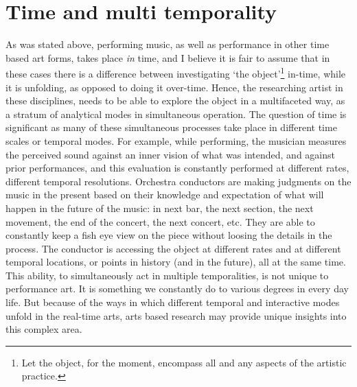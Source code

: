 
\section{Time and multi temporality}
\label{sec:performing-time}

As was stated above, performing music, as well as performance in other time based art forms, takes place \emph{in} time, and I believe it is fair to assume that in these cases there is a difference between investigating `the object'\footnote{Let the object, for the moment, encompass all and any aspects of the artistic practice.} in-time, while it is unfolding, as opposed to doing it over-time. Hence, the researching artist in these disciplines, needs to be able to explore the object in a multifaceted way, as a stratum of analytical modes in simultaneous operation. The question of time is significant as many of these simultaneous processes take place in  different time scales or temporal modes. For example, while performing, the musician measures the perceived sound against an inner vision of what was intended, and against prior performances, and this evaluation is constantly performed at different rates, different temporal resolutions. Orchestra conductors are making judgments on the music in the present based on their knowledge and expectation of what will happen in the future of the music: in next bar, the next section, the next movement, the end of the concert, the next concert, etc. They are able to constantly keep a fish eye view on the piece without loosing the details in the process. The conductor is accessing the object at different rates and at different temporal locations, or points in history (and in the future), all at the same time. This ability, to simultaneously act in multiple temporalities, is not unique to performance art. It is something we constantly do to various degrees in every day life. But because of the ways in which different temporal and interactive modes unfold in the real-time arts, arts based research may provide unique insights into this complex area. 

